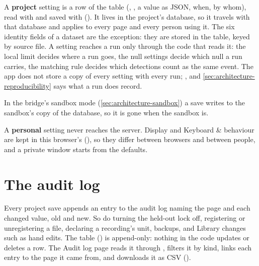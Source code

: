 A \textbf{project} setting is a row of the  table (, , a value
as JSON, when, by whom), read with  and saved with
 (). It lives in the project's
database, so it travels with that database and applies to every page and every person using it.
The six identity fields of a dataset are the exception: they are stored in the 
table, keyed by source file. A setting reaches a run only through the code that reads it: the
local limit decides where a run goes, the null settings decide which null a run carries, the
matching rule decides which detections count as the same event. The app does not store a copy of
every setting with every run; , and \cref{sec:architecture-reproducibility} says what a run
does record.

In the bridge's sandbox mode (\cref{sec:architecture-sandbox}) a save writes to the sandbox's copy
of the database, so it is gone when the sandbox is.

A \textbf{personal} setting never reaches the server. Display and Keyboard \& behaviour are kept in
this browser's  (), so they differ
between browsers and between people, and a private window starts from the defaults.

\section{The audit log}\label{sec:settings-audit}
Every project save appends an entry to the audit log naming the page and each changed value, old
and new. So do turning the held-out lock off, registering or unregistering a file, declaring a
recording's unit, backups, and Library changes such as hand edits. The  table
() is append-only: nothing in the code updates or deletes a row.
The Audit log page reads it through , filters it by kind, links each entry to
the page it came from, and downloads it as CSV ().

